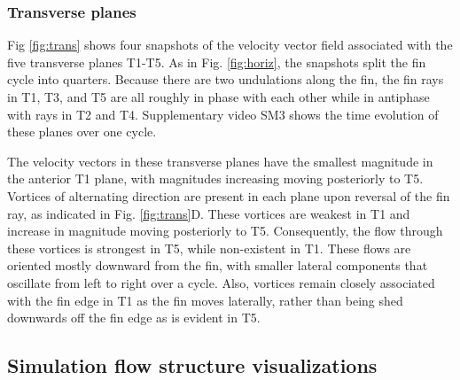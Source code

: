 \documentclass[onecolumn]{IEEEtran}
\begin{document}
\subsubsection{Transverse planes}

Fig \ref{fig:trans} shows four snapshots of the velocity vector
field associated with the five transverse planes T1-T5. As in
Fig. \ref{fig:horiz}, the snapshots split the fin cycle into
quarters. Because there are two undulations along the fin, the fin rays in
T1, T3, and T5 are all roughly in phase with each other while in
antiphase with rays in T2 and T4.  Supplementary video SM3 shows the time evolution of these planes over one cycle.

The velocity vectors in these transverse planes have the
smallest magnitude in the anterior T1 plane, with magnitudes
increasing moving posteriorly to T5. Vortices of alternating
direction are present in each plane upon reversal of the fin
ray, as indicated in Fig. \ref{fig:trans}D. These vortices are weakest in T1 and increase in magnitude
moving posteriorly to T5. Consequently, the flow through these
vortices is strongest in T5, while non-existent in T1. These
flows are oriented mostly downward from the fin, with smaller
lateral components that oscillate from left to right over a
cycle.  Also, vortices remain closely associated with the fin edge in 
T1 as the fin moves laterally, rather than being shed downwards off the fin edge as is evident in T5.


\subsection{Simulation flow structure visualizations}
\end{document}
